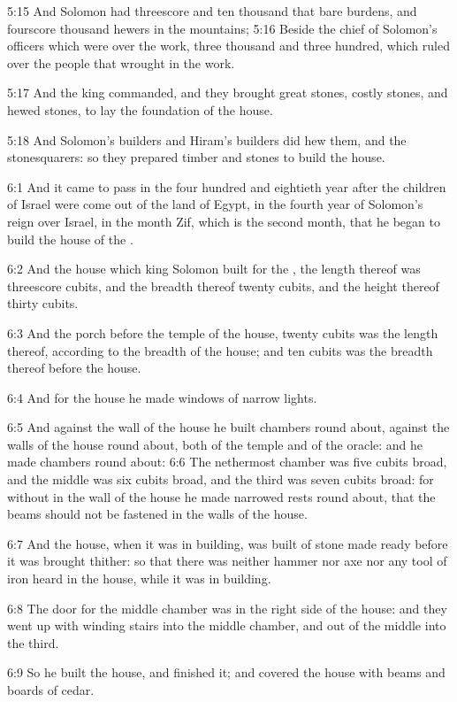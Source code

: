 5:15 And Solomon had threescore and ten thousand that bare burdens, and fourscore thousand hewers in the mountains; 5:16 Beside the chief of Solomon's officers which were over the work, three thousand and three hundred, which ruled over the people that wrought in the work.

5:17 And the king commanded, and they brought great stones, costly stones, and hewed stones, to lay the foundation of the house.

5:18 And Solomon's builders and Hiram's builders did hew them, and the stonesquarers: so they prepared timber and stones to build the house.

6:1 And it came to pass in the four hundred and eightieth year after the children of Israel were come out of the land of Egypt, in the fourth year of Solomon's reign over Israel, in the month Zif, which is the second month, that he began to build the house of the \LORD.

6:2 And the house which king Solomon built for the \LORD, the length thereof was threescore cubits, and the breadth thereof twenty cubits, and the height thereof thirty cubits.

6:3 And the porch before the temple of the house, twenty cubits was the length thereof, according to the breadth of the house; and ten cubits was the breadth thereof before the house.

6:4 And for the house he made windows of narrow lights.

6:5 And against the wall of the house he built chambers round about, against the walls of the house round about, both of the temple and of the oracle: and he made chambers round about: 6:6 The nethermost chamber was five cubits broad, and the middle was six cubits broad, and the third was seven cubits broad: for without in the wall of the house he made narrowed rests round about, that the beams should not be fastened in the walls of the house.

6:7 And the house, when it was in building, was built of stone made ready before it was brought thither: so that there was neither hammer nor axe nor any tool of iron heard in the house, while it was in building.

6:8 The door for the middle chamber was in the right side of the house: and they went up with winding stairs into the middle chamber, and out of the middle into the third.

6:9 So he built the house, and finished it; and covered the house with beams and boards of cedar.

